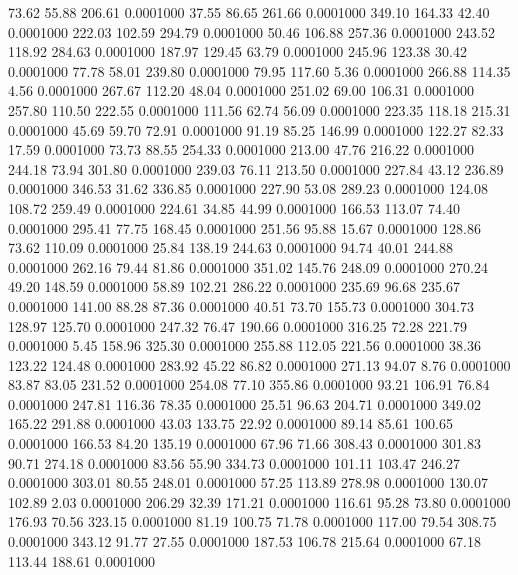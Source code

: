   73.62   55.88  206.61   0.0001000
  37.55   86.65  261.66   0.0001000
 349.10  164.33   42.40   0.0001000
 222.03  102.59  294.79   0.0001000
  50.46  106.88  257.36   0.0001000
 243.52  118.92  284.63   0.0001000
 187.97  129.45   63.79   0.0001000
 245.96  123.38   30.42   0.0001000
  77.78   58.01  239.80   0.0001000
  79.95  117.60    5.36   0.0001000
 266.88  114.35    4.56   0.0001000
 267.67  112.20   48.04   0.0001000
 251.02   69.00  106.31   0.0001000
 257.80  110.50  222.55   0.0001000
 111.56   62.74   56.09   0.0001000
 223.35  118.18  215.31   0.0001000
  45.69   59.70   72.91   0.0001000
  91.19   85.25  146.99   0.0001000
 122.27   82.33   17.59   0.0001000
  73.73   88.55  254.33   0.0001000
 213.00   47.76  216.22   0.0001000
 244.18   73.94  301.80   0.0001000
 239.03   76.11  213.50   0.0001000
 227.84   43.12  236.89   0.0001000
 346.53   31.62  336.85   0.0001000
 227.90   53.08  289.23   0.0001000
 124.08  108.72  259.49   0.0001000
 224.61   34.85   44.99   0.0001000
 166.53  113.07   74.40   0.0001000
 295.41   77.75  168.45   0.0001000
 251.56   95.88   15.67   0.0001000
 128.86   73.62  110.09   0.0001000
  25.84  138.19  244.63   0.0001000
  94.74   40.01  244.88   0.0001000
 262.16   79.44   81.86   0.0001000
 351.02  145.76  248.09   0.0001000
 270.24   49.20  148.59   0.0001000
  58.89  102.21  286.22   0.0001000
 235.69   96.68  235.67   0.0001000
 141.00   88.28   87.36   0.0001000
  40.51   73.70  155.73   0.0001000
 304.73  128.97  125.70   0.0001000
 247.32   76.47  190.66   0.0001000
 316.25   72.28  221.79   0.0001000
   5.45  158.96  325.30   0.0001000
 255.88  112.05  221.56   0.0001000
  38.36  123.22  124.48   0.0001000
 283.92   45.22   86.82   0.0001000
 271.13   94.07    8.76   0.0001000
  83.87   83.05  231.52   0.0001000
 254.08   77.10  355.86   0.0001000
  93.21  106.91   76.84   0.0001000
 247.81  116.36   78.35   0.0001000
  25.51   96.63  204.71   0.0001000
 349.02  165.22  291.88   0.0001000
  43.03  133.75   22.92   0.0001000
  89.14   85.61  100.65   0.0001000
 166.53   84.20  135.19   0.0001000
  67.96   71.66  308.43   0.0001000
 301.83   90.71  274.18   0.0001000
  83.56   55.90  334.73   0.0001000
 101.11  103.47  246.27   0.0001000
 303.01   80.55  248.01   0.0001000
  57.25  113.89  278.98   0.0001000
 130.07  102.89    2.03   0.0001000
 206.29   32.39  171.21   0.0001000
 116.61   95.28   73.80   0.0001000
 176.93   70.56  323.15   0.0001000
  81.19  100.75   71.78   0.0001000
 117.00   79.54  308.75   0.0001000
 343.12   91.77   27.55   0.0001000
 187.53  106.78  215.64   0.0001000
  67.18  113.44  188.61   0.0001000
